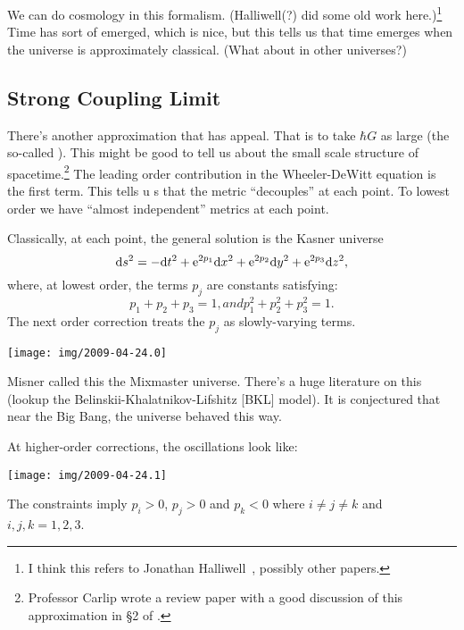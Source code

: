 We can do cosmology in this formalism. (Halliwell(?) did some old work
here.)\footnote{I think this refers to Jonathan
Halliwell~, possibly other papers.} Time has sort of emerged, which is nice, but this tells us that
time emerges when the universe is approximately classical. (What about
in other universes?)

\subsection{Strong Coupling Limit}

There's another approximation that has appeal. That is to take $\hbar G$
as large (the so-called ). This
might be good to tell us about the small scale structure of
spacetime.\footnote{Professor Carlip wrote a review paper with a good
discussion of this approximation in \S2 of .}
The leading order contribution in the Wheeler-DeWitt equation is the
first term. This tells u s that the metric ``decouples'' at each point.
To lowest order we have ``almost independent'' metrics at each point.

Classically, at each point, the general solution is the Kasner universe
\begin{equation}
\mathrm{d} s^{2} = -\mathrm{d} t^{2} + \mathrm{e}^{2p_{1}}\mathrm{d} x^{2} + \mathrm{e}^{2p_{2}}\mathrm{d} y^{2}
+ \mathrm{e}^{2p_{3}}\mathrm{d} z^{2},
\end{equation}
where, at lowest order, the terms $p_{j}$ are constants satisfying:
\begin{subequations}
\begin{equation}
p_{1}+p_{2}+p_{3}=1,
\end{equation}
and
\begin{equation}
p_{1}^{2}+p_{2}^{2}+p_{3}^{2}=1.
\end{equation}
\end{subequations}
The next order correction treats the $p_{j}$ as slowly-varying terms.

\begin{center}
\texttt{[image: img/2009-04-24.0]}
\end{center}

Misner called this the Mixmaster universe. There's a huge literature on
this (lookup the Belinskii-Khalatnikov-Lifshitz [BKL] model). It is
conjectured that near the Big Bang, the universe behaved this way.

At higher-order corrections, the oscillations look like:

\begin{center}
\texttt{[image: img/2009-04-24.1]}
\end{center}

The constraints imply $p_{i}>0$, $p_{j}>0$ and $p_{k}<0$ where $i\neq j\neq k$
and $i,j,k=1,2,3$.
